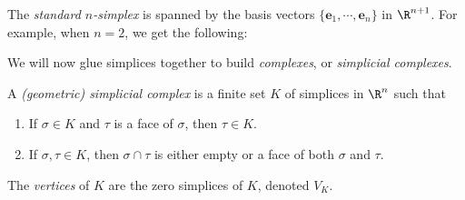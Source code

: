 \documentclass[a4paper]{article}
\begin{document}
\begin{eg}
  The \emph{standard $n$-simplex} is spanned by the basis vectors $\{\mathbf{e}_1, \cdots, \mathbf{e}_n\}$ in $\R^{n + 1}$. For example, when $n = 2$, we get the following:
  \begin{center}
  \end{center}
\end{eg}

We will now glue simplices together to build \emph{complexes}, or \emph{simplicial complexes}.

\begin{defi}
  A \emph{(geometric) simplicial complex} is a finite set $K$ of simplices in $\R^n$ such that
  \begin{enumerate}
    \item If $\sigma \in K$ and $\tau$ is a face of $\sigma$, then $\tau \in K$.
    \item If $\sigma, \tau \in K$, then $\sigma \cap \tau$ is either empty or a face of both $\sigma$ and $\tau$.
  \end{enumerate}
\end{defi}

\begin{defi}[Vertices]
  The \emph{vertices} of $K$ are the zero simplices of $K$, denoted $V_K$.
\end{defi}
\end{document}
